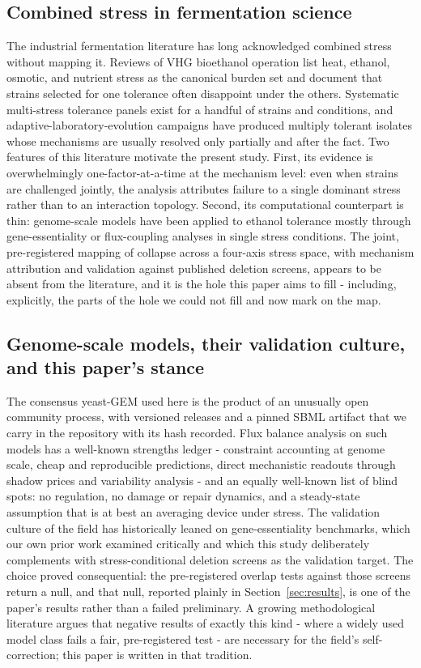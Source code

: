 \documentclass[12pt]{article}
\begin{document}
\subsection{Combined stress in fermentation science}

The industrial fermentation literature has long acknowledged combined
stress without mapping it. Reviews of VHG bioethanol operation list heat,
ethanol, osmotic, and nutrient stress as the canonical burden set and
document that strains selected for one tolerance often disappoint under
the others. Systematic multi-stress tolerance panels exist for a handful
of strains and conditions, and adaptive-laboratory-evolution campaigns
have produced multiply tolerant isolates whose mechanisms are usually
resolved only partially and after the fact. Two features of this
literature motivate the present study. First, its evidence is
overwhelmingly one-factor-at-a-time at the mechanism level: even when
strains are challenged jointly, the analysis attributes failure to a
single dominant stress rather than to an interaction topology. Second,
its computational counterpart is thin: genome-scale models have been
applied to ethanol tolerance mostly through gene-essentiality or
flux-coupling analyses in single stress conditions. The joint,
pre-registered mapping of collapse across a four-axis stress space, with
mechanism attribution and validation against published deletion screens,
appears to be absent from the literature, and it is the hole this paper
aims to fill - including, explicitly, the parts of the hole we could not
fill and now mark on the map.

\subsection{Genome-scale models, their validation culture, and this
paper's stance}

The consensus yeast-GEM used here is the product of an unusually open
community process, with versioned releases and a pinned SBML artifact
that we carry in the repository with its hash recorded. Flux balance
analysis on such models has a well-known strengths ledger - constraint
accounting at genome scale, cheap and reproducible predictions, direct
mechanistic readouts through shadow prices and variability analysis - and
an equally well-known list of blind spots: no regulation, no damage or
repair dynamics, and a steady-state assumption that is at best an
averaging device under stress. The validation culture of the field has
historically leaned on gene-essentiality benchmarks, which our own prior
work examined critically and which this study deliberately complements
with stress-conditional deletion screens as the validation target. The
choice proved consequential: the pre-registered overlap tests against
those screens return a null, and that null, reported plainly in
Section~\ref{sec:results}, is one of the paper's results rather than a
failed preliminary. A growing methodological literature argues that
negative results of exactly this kind - where a widely used model class
fails a fair, pre-registered test - are necessary for the field's
self-correction; this paper is written in that tradition.
\end{document}
